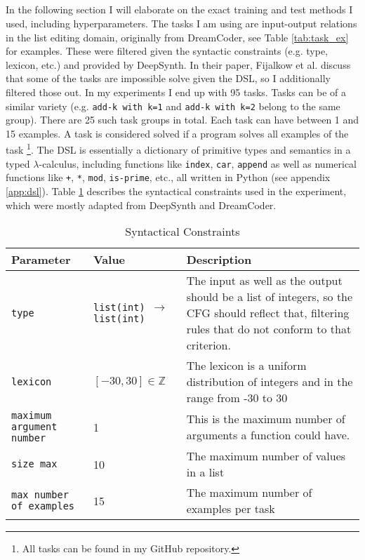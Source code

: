 \subsection{}
In the following section I will elaborate on the exact training and test methods I used, including hyperparameters.
The tasks I am using are input-output relations in the list editing domain, originally from DreamCoder, see Table \ref{tab:task_ex} for examples. These were filtered given the syntactic constraints (e.g. type, lexicon, etc.) and provided by DeepSynth. 
In their paper, Fijalkow et al. discuss that some of the tasks are impossible solve given the DSL, so I additionally filtered those out. In my experiments I end up with 95 tasks. Tasks can be of a similar variety (e.g. \texttt{add-k with k=1} and \texttt{add-k with k=2} belong to the same group). There are 25 such task groups in total. Each task can have between 1 and 15 examples. A task is considered solved if a program solves all examples of the task \footnote{All tasks can be found in my GitHub repository.}.
The DSL is essentially a dictionary of primitive types and semantics in a typed $\lambda$-calculus, including functions like \texttt{index}, \texttt{car}, \texttt{append} as well as numerical functions like \texttt{+}, \texttt{*}, \texttt{mod}, \texttt{is-prime}, etc., all written in Python (see appendix \ref{app:dsl}).
Table \ref{tab:synconst} describes the syntactical constraints used in the experiment, which were mostly adapted from DeepSynth and DreamCoder.

\begin{table}[H]
    \centering
    \begin{tabularx}{\textwidth}{|l|l|X|}
        \hline
        \textbf{Parameter} & \textbf{Value} & \textbf{Description} \\\hline
        \texttt{type} & \texttt{list(int) $\rightarrow$ list(int)} & The input as well as the output should be a list of integers, so the CFG should reflect that, filtering rules that do not conform to that criterion. \\\hline
        \texttt{lexicon} &  $[-30, 30] \in \mathbb{Z}$ & The lexicon is a uniform distribution of integers and in the range from -30 to 30 \\\hline
        \texttt{maximum argument number} & 1 & This is the maximum number of arguments a function could have. \\\hline
        \texttt{size max} & 10 & The maximum number of values in a list \\\hline 
        \texttt{max number of examples} & 15 & The maximum number of examples per task \\\hline 
    \end{tabularx}
    \caption{Syntactical Constraints}
    \label{tab:synconst}
\end{table}

